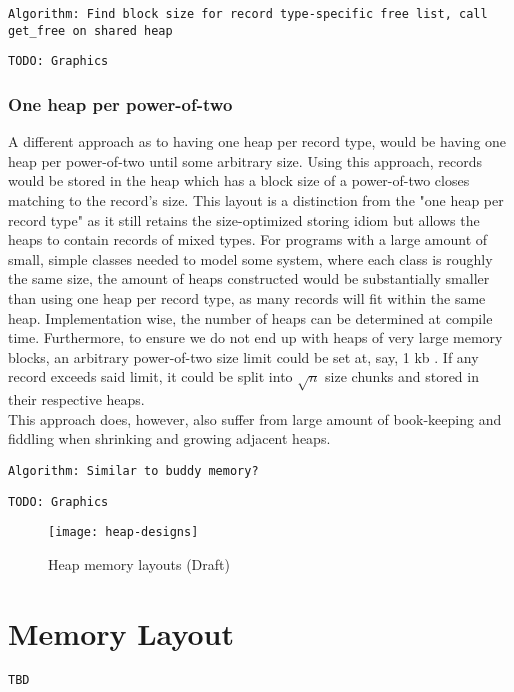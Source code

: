 \texttt{Algorithm: Find block size for record type-specific free list, call get\_free on shared heap}

\texttt{TODO: Graphics}

\subsubsection{One heap per power-of-two}
A different approach as to having one heap per record type, would be having one heap per power-of-two until some arbitrary size. Using this approach, records would be stored in the heap which has a block size of a power-of-two closes matching to the record's size. This layout is a distinction from the "one heap per record type" as it still retains the size-optimized storing idiom but allows the heaps to contain records of mixed types. For programs with a large amount of small, simple classes needed to model some system, where each class is roughly the same size, the amount of heaps constructed would be substantially smaller than using one heap per record type, as many records will fit within the same heap. Implementation wise, the number of heaps can be determined at compile time. Furthermore, to ensure we do not end up with heaps of very large memory blocks, an arbitrary power-of-two size limit could be set at, say, 1 kb . If any record exceeds said limit, it could be split into $\sqrt{n}$ size chunks and stored in their respective heaps.\\
This approach does, however, also suffer from large amount of book-keeping and fiddling when shrinking and growing adjacent heaps.

\texttt{Algorithm: Similar to buddy memory?}

\texttt{TODO: Graphics}

\begin{figure}[H]
  \centering
  \texttt{[image: heap-designs]}
  \caption{Heap memory layouts (Draft)}
\end{figure}


\section{\rooplpp Memory Layout}
\label{sec:rooplpp-memory-layout}
\texttt{TBD}